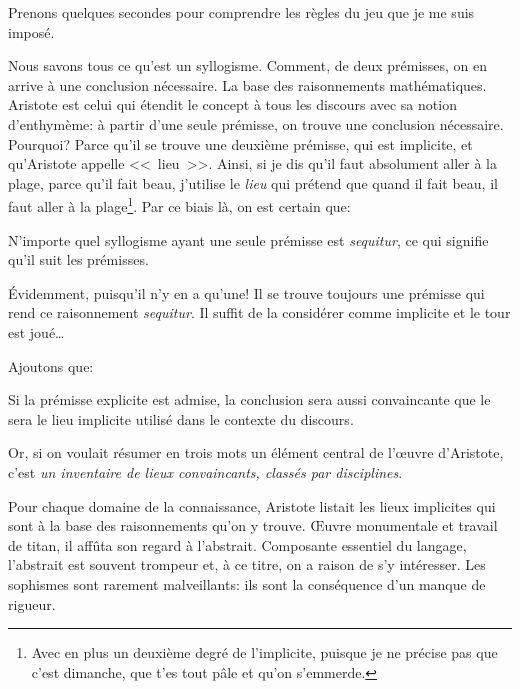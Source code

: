 Prenons quelques secondes pour comprendre les règles du jeu que je me suis imposé.

Nous savons tous ce qu'est un syllogisme. Comment, de deux prémisses, on en arrive à une conclusion nécessaire.
La base des raisonnements mathématiques. Aristote est celui qui étendit le concept à tous les discours avec sa
notion d'enthymème: à partir d'une seule prémisse, on trouve une conclusion nécessaire. Pourquoi? Parce qu'il
se trouve une deuxième prémisse, qui est implicite, et qu'Aristote appelle <<~lieu~>>. Ainsi, si je dis qu'il faut
absolument aller à la plage, parce qu'il fait beau, j'utilise le \emph{lieu} qui prétend que quand il fait beau,
il faut aller à la plage\footnote{Avec en plus un deuxième degré de l'implicite, puisque je ne précise pas que c'est
dimanche, que t'es tout pâle et qu'on s'emmerde.}. Par ce biais là, on est certain que:

\begin{emphpar}
    N'importe quel syllogisme ayant une seule prémisse est \emph{sequitur}, ce qui signifie qu'il suit les
    prémisses.
\end{emphpar}

Évidemment, puisqu'il n'y en a qu'une! Il se trouve toujours une prémisse qui rend ce raisonnement \emph{sequitur}.
Il suffit de la considérer comme implicite et le tour est joué\dots{}

Ajoutons que:

\begin{emphpar}
    Si la prémisse explicite est admise, la conclusion sera aussi convaincante que le sera le lieu implicite utilisé
    dans le contexte du discours.
\end{emphpar}

Or, si on voulait résumer en trois mots un élément central de l’œuvre d'Aristote, c'est \emph{un inventaire de lieux
convaincants, classés par disciplines}.

Pour chaque domaine de la connaissance, Aristote listait les lieux implicites qui sont à la base des raisonnements
qu'on y trouve. Œuvre monumentale et travail de titan, il affûta son regard à l'abstrait. Composante essentiel du
langage, l'abstrait est souvent trompeur et, à ce titre, on a raison de s'y intéresser. Les sophismes sont rarement
malveillants: ils sont la conséquence d'un manque de rigueur.

